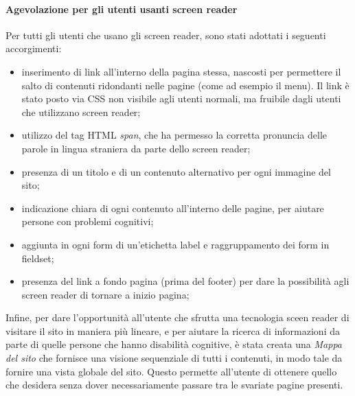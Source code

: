 \paragraph*{Agevolazione per gli utenti usanti screen reader}Per tutti gli utenti che usano gli screen reader, sono stati adottati i seguenti accorgimenti:
\begin{itemize}

    \item inserimento di link all'interno della pagina stessa, nascosti per permettere il salto di contenuti ridondanti nelle pagine (come ad esempio il menu). Il link è stato posto via CSS non visibile agli utenti normali, ma fruibile dagli utenti che utilizzano screen reader;
    \item utilizzo del tag HTML \textit{span}, che ha permesso la corretta pronuncia delle parole in lingua straniera da parte dello screen reader;
    \item presenza di un titolo e di un contenuto alternativo per ogni immagine del sito;

    \item indicazione chiara di ogni contenuto all'interno delle pagine, per aiutare persone con problemi cognitivi;

    \item aggiunta in ogni form di un'etichetta label e raggruppamento dei form in fieldset;

    \item presenza del link a fondo pagina (prima del footer) per dare la possibilità agli screen reader di tornare a inizio pagina;

\end{itemize}
Infine, per dare l'opportunit\`a all'utente che sfrutta una tecnologia sceen reader di visitare il sito in maniera pi\`u lineare, e per aiutare la ricerca di informazioni da parte di quelle persone che hanno disabilit\`a cognitive, \`e stata creata una \textit{Mappa del sito} che fornisce una visione sequenziale di tutti i contenuti, in modo tale da fornire una vista globale del sito. Questo permette all'utente di ottenere quello che desidera senza dover necessariamente passare tra le svariate pagine presenti.

